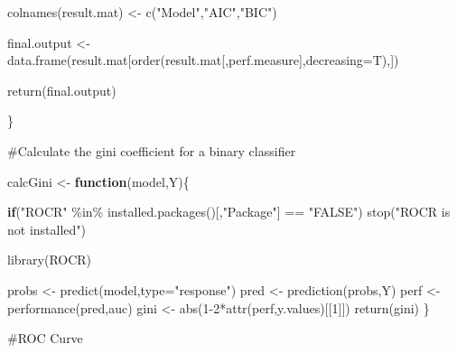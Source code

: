 \documentclass[
  letterpaper,
  DIV=11,
  numbers=noendperiod]{scrartcl}
\newenvironment{Shaded}{\begin{snugshade}}{\end{snugshade}}
\newcommand{\AttributeTok}[1]{\textcolor[rgb]{0.40,0.45,0.13}{#1}}
\newcommand{\ControlFlowTok}[1]{\textcolor[rgb]{0.00,0.23,0.31}{\textbf{#1}}}
\newcommand{\DecValTok}[1]{\textcolor[rgb]{0.68,0.00,0.00}{#1}}
\newcommand{\FunctionTok}[1]{\textcolor[rgb]{0.28,0.35,0.67}{#1}}
\newcommand{\NormalTok}[1]{\textcolor[rgb]{0.00,0.23,0.31}{#1}}
\newcommand{\OtherTok}[1]{\textcolor[rgb]{0.00,0.23,0.31}{#1}}
\newcommand{\SpecialCharTok}[1]{\textcolor[rgb]{0.37,0.37,0.37}{#1}}
\newcommand{\StringTok}[1]{\textcolor[rgb]{0.13,0.47,0.30}{#1}}
\begin{document}
\begin{Shaded}
\begin{Highlighting}[]
  
  
  
  \FunctionTok{colnames}\NormalTok{(result.mat) }\OtherTok{\textless{}{-}} \FunctionTok{c}\NormalTok{(}\StringTok{"Model"}\NormalTok{,}\StringTok{"AIC"}\NormalTok{,}\StringTok{"BIC"}\NormalTok{)}
  
  
  
\NormalTok{  final.output }\OtherTok{\textless{}{-}} \FunctionTok{data.frame}\NormalTok{(result.mat[}\FunctionTok{order}\NormalTok{(result.mat[,perf.measure],}\AttributeTok{decreasing=}\NormalTok{T),])}
  
  \FunctionTok{return}\NormalTok{(final.output)}
  
\NormalTok{\}}
\end{Highlighting}
\end{Shaded}

\#Calculate the gini coefficient for a binary classifier

\begin{Shaded}
\begin{Highlighting}[]
\NormalTok{calcGini }\OtherTok{\textless{}{-}} \ControlFlowTok{function}\NormalTok{(model,Y)\{}
  
  \ControlFlowTok{if}\NormalTok{(}\StringTok{"ROCR"} \SpecialCharTok{\%in\%} \FunctionTok{installed.packages}\NormalTok{()[,}\StringTok{"Package"}\NormalTok{] }\SpecialCharTok{==} \StringTok{"FALSE"}\NormalTok{) }\FunctionTok{stop}\NormalTok{(}\StringTok{"ROCR is not installed"}\NormalTok{)}
  
  \FunctionTok{library}\NormalTok{(ROCR)}
  
\NormalTok{  probs }\OtherTok{\textless{}{-}} \FunctionTok{predict}\NormalTok{(model,}\AttributeTok{type=}\StringTok{"response"}\NormalTok{)}
\NormalTok{  pred }\OtherTok{\textless{}{-}} \FunctionTok{prediction}\NormalTok{(probs,Y)}
\NormalTok{  perf }\OtherTok{\textless{}{-}} \FunctionTok{performance}\NormalTok{(pred,}\StringTok{\textquotesingle{}auc\textquotesingle{}}\NormalTok{)}
\NormalTok{  gini }\OtherTok{\textless{}{-}} \FunctionTok{abs}\NormalTok{(}\DecValTok{1{-}2}\SpecialCharTok{*}\FunctionTok{attr}\NormalTok{(perf,}\StringTok{\textquotesingle{}y.values\textquotesingle{}}\NormalTok{)[[}\DecValTok{1}\NormalTok{]])}
  \FunctionTok{return}\NormalTok{(gini)}
\NormalTok{\}}
\end{Highlighting}
\end{Shaded}

\#ROC Curve
\end{document}
